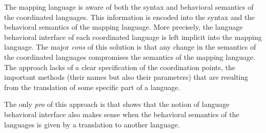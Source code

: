 The mapping language is aware of both the syntax and behavioral semantics of the coordinated languages. This information is encoded into the syntax and the behavioral semantics of the mapping language. More precisely, the language behavioral interface of each coordinated language is left implicit into the mapping language. The major \emph{cons} of this solution is that any change in the semantics of the coordinated languages compromises the semantics of the mapping language. The approach lacks of a clear specification of the coordination points, \ie the important methods (their names but also their parameters) that are resulting from the translation of some specific part of a language. 

The only \emph{pro} of this approach is that shows that the notion of language behavioral interface also makes sense when the behavioral semantics of the languages is given by a translation to another language.

 
